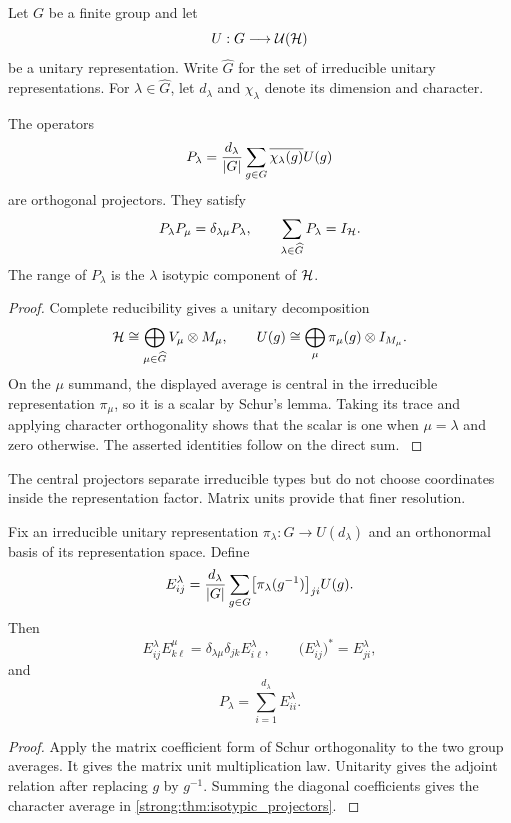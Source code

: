 Let \(G\) be a finite group and let
\[
U:G\longrightarrow\Ucal(\Hcal)
\]
be a unitary representation. Write \(\widehat G\) for the set of irreducible unitary representations. For \(\lambda\in\widehat G\), let \(d_\lambda\) and \(\chi_\lambda\) denote its dimension and character.

\begin{theorem}\label{strong:theorem:003}\label{strong:thm:isotypic_projectors}
The operators
\[
P_\lambda
=
\frac{d_\lambda}{\left\lvert G\right\rvert}
\sum_{g\in G}
\overline{\chi_\lambda(g)}U(g)
\]
are orthogonal projectors. They satisfy
\[
P_\lambda P_\mu=\delta_{\lambda\mu}P_\lambda,
\qquad
\sum_{\lambda\in\widehat G}P_\lambda=I_{\Hcal}.
\]
The range of \(P_\lambda\) is the \(\lambda\) isotypic component of \(\Hcal\).
\end{theorem}

\begin{proof}\label{strong:proof:005}
Complete reducibility gives a unitary decomposition
\[
\Hcal
\cong
\bigoplus_{\mu\in\widehat G}
V_\mu\otimes M_\mu,
\qquad
U(g)
\cong
\bigoplus_\mu
\pi_\mu(g)\otimes I_{M_\mu}.
\]
On the \(\mu\) summand, the displayed average is central in the irreducible representation \(\pi_\mu\), so it is a scalar by Schur's lemma. Taking its trace and applying character orthogonality shows that the scalar is one when \(\mu=\lambda\) and zero otherwise. The asserted identities follow on the direct sum.
\label{strong:proof:005:end}\end{proof}

The central projectors separate irreducible types but do not choose coordinates inside the representation factor. Matrix units provide that finer resolution.

\begin{theorem}\label{strong:theorem:004}\label{strong:thm:representation_matrix_units}
Fix an irreducible unitary representation \(\pi_\lambda:G\to U(d_\lambda)\) and an orthonormal basis of its representation space. Define
\[
E_{ij}^{\lambda}
=
\frac{d_\lambda}{\left\lvert G\right\rvert}
\sum_{g\in G}
\bigl[\pi_\lambda(g^{-1})\bigr]_{ji}U(g).
\]
Then
\[
E_{ij}^{\lambda}E_{k\ell}^{\mu}
=
\delta_{\lambda\mu}\delta_{jk}E_{i\ell}^{\lambda},
\qquad
\bigl(E_{ij}^{\lambda}\bigr)^*=E_{ji}^{\lambda},
\]
and
\[
P_\lambda=\sum_{i=1}^{d_\lambda}E_{ii}^{\lambda}.
\]
\end{theorem}

\begin{proof}\label{strong:proof:006}
Apply the matrix coefficient form of Schur orthogonality to the two group averages. It gives the matrix unit multiplication law. Unitarity gives the adjoint relation after replacing \(g\) by \(g^{-1}\). Summing the diagonal coefficients gives the character average in \cref{strong:thm:isotypic_projectors}.
\label{strong:proof:006:end}\end{proof}

